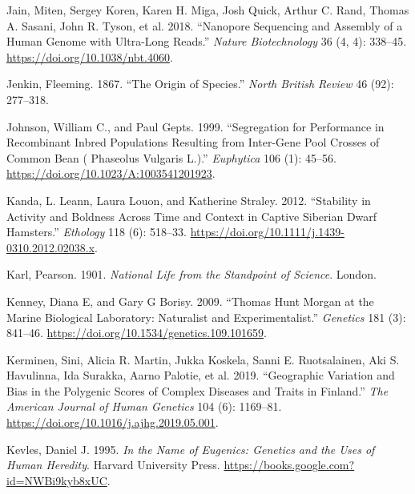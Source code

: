 \documentclass[
]{book}
\newlength{\cslhangindent}
\newlength{\cslentryspacingunit} %
\newenvironment{CSLReferences}[2] %
 {%
  \setlength{\parindent}{0pt}
  \ifodd #1
  \let\oldpar\par
  \def\par{\hangindent=\cslhangindent\oldpar}
  \fi
  \setlength{\parskip}{#2\cslentryspacingunit}
 }%
 {}
\begin{document}
\begin{CSLReferences}{1}{0}
\leavevmode{}%
Jain, Miten, Sergey Koren, Karen H. Miga, Josh Quick, Arthur C. Rand, Thomas A. Sasani, John R. Tyson, et al. 2018. {``Nanopore Sequencing and Assembly of a Human Genome with Ultra-Long Reads.''} \emph{Nature Biotechnology} 36 (4, 4): 338--45. \url{https://doi.org/10.1038/nbt.4060}.

\leavevmode{}%
Jenkin, Fleeming. 1867. {``The Origin of Species.''} \emph{North British Review} 46 (92): 277--318.

\leavevmode{}%
Johnson, William C., and Paul Gepts. 1999. {``Segregation for Performance in Recombinant Inbred Populations Resulting from Inter-Gene Pool Crosses of Common Bean ( {Phaseolus} Vulgaris {L}.).''} \emph{Euphytica} 106 (1): 45--56. \url{https://doi.org/10.1023/A:1003541201923}.

\leavevmode{}%
Kanda, L. Leann, Laura Louon, and Katherine Straley. 2012. {``Stability in {Activity} and {Boldness Across Time} and {Context} in {Captive Siberian Dwarf Hamsters}.''} \emph{Ethology} 118 (6): 518--33. \url{https://doi.org/10.1111/j.1439-0310.2012.02038.x}.

\leavevmode{}%
Karl, Pearson. 1901. \emph{National {Life} from the Standpoint of {Science}}. {London}.

\leavevmode{}%
Kenney, Diana E, and Gary G Borisy. 2009. {``Thomas {Hunt Morgan} at the {Marine Biological Laboratory}: {Naturalist} and {Experimentalist}.''} \emph{Genetics} 181 (3): 841--46. \url{https://doi.org/10.1534/genetics.109.101659}.

\leavevmode{}%
Kerminen, Sini, Alicia R. Martin, Jukka Koskela, Sanni E. Ruotsalainen, Aki S. Havulinna, Ida Surakka, Aarno Palotie, et al. 2019. {``Geographic {Variation} and {Bias} in the {Polygenic Scores} of {Complex Diseases} and {Traits} in {Finland}.''} \emph{The American Journal of Human Genetics} 104 (6): 1169--81. \url{https://doi.org/10.1016/j.ajhg.2019.05.001}.

\leavevmode{}%
Kevles, Daniel J. 1995. \emph{In the {Name} of {Eugenics}: {Genetics} and the {Uses} of {Human Heredity}}. {Harvard University Press}. \url{https://books.google.com?id=NWBi9kyb8xUC}.


\end{CSLReferences}
\end{document}
